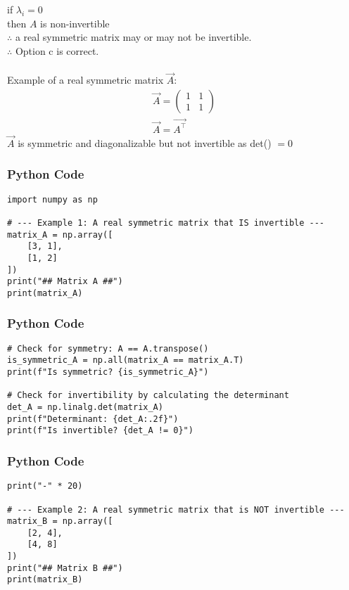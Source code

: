 \documentclass{beamer}
\begin{document}
\begin{frame}
if $\lambda_i = 0$ \\
then $A$ is non-invertible \\

$\therefore$ a real symmetric matrix may or may not be invertible.\\
$\therefore$ Option c is correct.\\\\
Example of a real symmetric matrix $\vec{A}$:
\begin{align}
    \vec{A}=\begin{pmatrix}
        1 & 1\\1& 1
    \end{pmatrix}\\
    \vec{A}=\vec{A^\top}
\end{align}
$\vec{A}$ is symmetric and diagonalizable but not invertible as det() $=0$
\end{frame}


\begin{frame}[fragile]
\frametitle{Python Code}
\begin{lstlisting}
import numpy as np

# --- Example 1: A real symmetric matrix that IS invertible ---
matrix_A = np.array([
    [3, 1],
    [1, 2]
])
print("## Matrix A ##")
print(matrix_A)
\end{lstlisting}
\end{frame}

\begin{frame}[fragile]
\frametitle{Python Code}
\begin{lstlisting}
# Check for symmetry: A == A.transpose()
is_symmetric_A = np.all(matrix_A == matrix_A.T)
print(f"Is symmetric? {is_symmetric_A}")

# Check for invertibility by calculating the determinant
det_A = np.linalg.det(matrix_A)
print(f"Determinant: {det_A:.2f}")
print(f"Is invertible? {det_A != 0}")
\end{lstlisting}
\end{frame}

\begin{frame}[fragile]
\frametitle{Python Code}
\begin{lstlisting}
print("-" * 20)

# --- Example 2: A real symmetric matrix that is NOT invertible ---
matrix_B = np.array([
    [2, 4],
    [4, 8]
])
print("## Matrix B ##")
print(matrix_B)
\end{lstlisting}
\end{frame}
\end{document}
